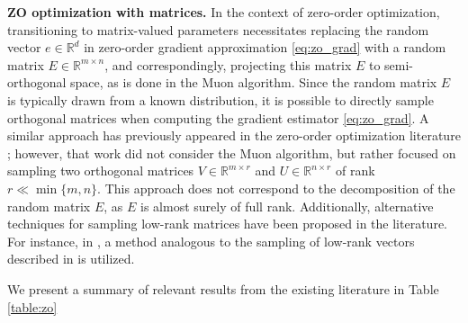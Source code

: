 \documentclass{article}
\theoremstyle{plain}
\theoremstyle{definition}
\theoremstyle{remark}
\begin{document}
\textbf{ZO optimization with matrices.}
In the context of zero-order optimization, transitioning to matrix-valued parameters necessitates replacing the random vector $e \in \mathbb{R}^d$ in zero-order gradient approximation \eqref{eq:zo_grad} with a random matrix $E \in \mathbb{R}^{m \times n}$, and correspondingly, projecting this matrix $E$ to semi-orthogonal space, as is done in the Muon algorithm. Since the random matrix $E$ is typically drawn from a known distribution, it is possible to directly sample orthogonal matrices when computing the gradient estimator \eqref{eq:zo_grad}. A similar approach has previously appeared in the zero-order optimization literature \cite{lozo}; however, that work did not consider the Muon algorithm, but rather focused on sampling two orthogonal matrices $V \in \mathbb{R}^{m \times r}$ and $U \in \mathbb{R}^{n \times r}$ of rank $r \ll \min\{m, n\}$. This approach does not correspond to the decomposition of the random matrix $E$, as $E$ is almost surely of full rank. Additionally, alternative techniques for sampling low-rank matrices have been proposed in the literature. For instance, in \cite{zo_random_subspaces}, a method analogous to the sampling of low-rank vectors described in \cite{roberts2023direct, nozawa2025zeroth} is utilized.


We present a summary of relevant results from the existing literature in Table \ref{table:zo}
\end{document}

